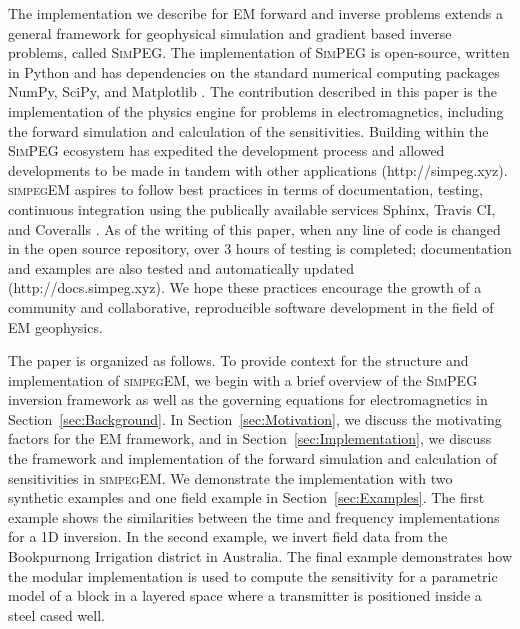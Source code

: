\documentclass[preprint,review,3p,times,onecolumn,authoryear]{elsarticle}
\newcommand{\SimPEG}{\textsc{SimPEG}\xspace}
\newcommand{\simpegEM}{\textsc{simpegEM}\xspace}
\begin{document}
The implementation we describe for EM forward and inverse problems extends a
general framework for geophysical simulation and gradient based inverse
problems, called \SimPEG \citep{Cockett2015}. The implementation of \SimPEG is
open-source, written in Python and has dependencies on the standard numerical
computing packages NumPy, SciPy, and Matplotlib \citep{numpy, scipy,
matplotlib}. The contribution described in this paper is the implementation of
the physics engine for problems in electromagnetics, including the forward
simulation and calculation of the sensitivities. Building within the \SimPEG
ecosystem has expedited the development process and allowed developments to be
made in tandem with other applications (http://simpeg.xyz). \simpegEM aspires
to follow best practices in terms of documentation, testing, continuous
integration using the publically available services Sphinx, Travis CI, and
Coveralls \citep{Sphinx, Travis, Coveralls}. As of the writing of this paper,
when any line of code is changed in the open source repository, over 3 hours
of testing is completed; documentation and examples are also tested and
automatically updated (http://docs.simpeg.xyz). We hope these practices
encourage the growth of a community and collaborative, reproducible software
development in the field of EM geophysics.

\bigskip

The paper is organized as follows. To provide context for the structure and
implementation of \simpegEM, we begin with a brief overview of the \SimPEG
inversion framework as well as the governing equations for electromagnetics in
Section~\ref{sec:Background}. In Section~\ref{sec:Motivation}, we discuss the
motivating factors for the EM framework, and in
Section~\ref{sec:Implementation}, we discuss the framework and implementation
of the forward simulation and calculation of sensitivities in \simpegEM. We
demonstrate the implementation with two synthetic examples and one field
example in Section~\ref{sec:Examples}. The first example shows the
similarities between the time and frequency implementations for a 1D
inversion. In the second example, we invert field data from the Bookpurnong
Irrigation district in Australia. The final example demonstrates how the
modular implementation is used to compute the sensitivity for a parametric
model of a block in a layered space where a transmitter is positioned inside a
steel cased well.


\end{document}
